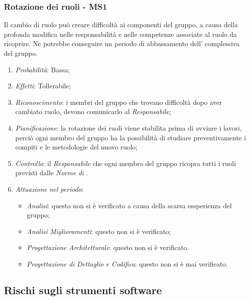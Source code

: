 \subsubsection{Rotazione dei ruoli - MS1}
Il cambio di ruolo pu\`o creare difficolt\`a ai componenti del gruppo, a causa della profonda modifica nelle responsabilit\`a e nelle competenze associate al ruolo da ricoprire. Ne potrebbe conseguire un periodo di abbassamento dell' complessiva del gruppo.
\begin{enumerate}
\item \textit{Probabilit\`a}: Bassa;
\item \textit{Effetti}: Tollerabile;
\item \textit{Riconoscimento}: i membri del gruppo che trovano difficoltà dopo aver cambiato ruolo, devono comunicarlo al \textit{Responsabile};
\item \textit{Pianificazione}: la rotazione dei ruoli viene stabilita prima di avviare i lavori, perci\`o ogni membro del gruppo ha la possibilit\`a di studiare preventivamente i compiti e le metodologie del nuovo ruolo;
\item \textit{Controllo}: il \textit{Responsabile}  che ogni membro del gruppo ricopra tutti i ruoli previsti dalle \textit{Norme di }.
\item \textit{Attuazione nel periodo}: 
	\begin{itemize}
	\item \textit{Analisi}: questo  non si è verificato a causa della scarsa essperienza del gruppo;
	\item \textit{Analisi Miglioramenti}: questo  non si è verificato;
	\item \textit{Progettazione Architetturale}: questo  non si è verificato.
	\item \textit{Progettazione di Dettaglio e Codifica}: questo  non si è mai verificato.
	\end{itemize}
\end{enumerate}

\subsection{Rischi sugli strumenti software}
